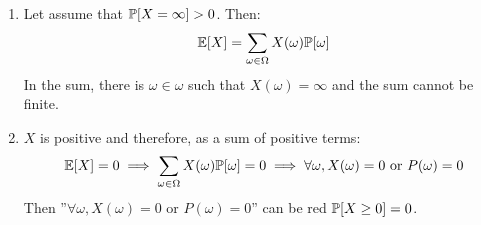 \begin{solution}
  \begin{enumerate}
    \item Let assume that $\mathbb{P}[X = \infty] > 0$. Then:
          \[ \mathbb{E}[X] = \sum_{\omega \in \Omega} X(\omega) \mathbb{P}[\omega] \]
          In the sum, there is $\omega \in \omega$ such that $X(\omega) = \infty$ and the sum cannot be finite.
    \item $X$ is positive and therefore, as a sum of positive terms:
          \[\mathbb{E}[X] = 0 \implies \sum_{\omega \in \Omega} X(\omega) \mathbb{P}[\omega] = 0 \implies \forall \omega, X(\omega) = 0 \text{ or } P(\omega) = 0 \]
          Then ''$\forall \omega, X(\omega) = 0 \text{ or } P(\omega) = 0$'' can be red $\mathbb{P}[X \geq 0] = 0$.
  \end{enumerate}
\end{solution}